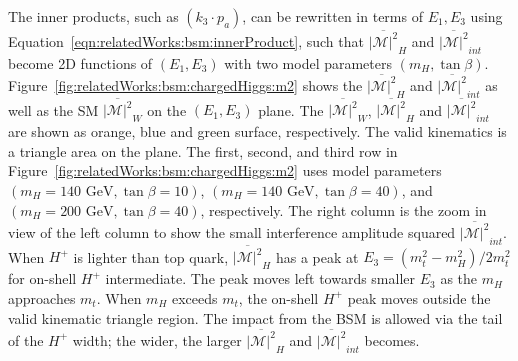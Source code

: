 \noindent The inner products, such as $(k_3 \cdot p_a) $, can be rewritten in terms of $E_1, E_3$ using Equation~\ref{eqn:relatedWorks:bsm:innerProduct}, such that $\overline{ |\mathcal{M}|^2 } _{H}$ and $ \overline{ |\mathcal{M}|^2 } _{int}$ become 2D functions of $(E_1, E_3)$  with two model parameters $(m_H, \tan\beta)$. Figure~\ref{fig:relatedWorks:bsm:chargedHiggs:m2} shows the $\overline{ |\mathcal{M}|^2 } _{H}$ and $ \overline{ |\mathcal{M}|^2 } _{int}$ as well as the SM $\overline{ |\mathcal{M}|^2 } _{W}$ on the $(E_1, E_3)$  plane. The $\overline{ |\mathcal{M}|^2 } _{W}$, $\overline{ |\mathcal{M}|^2 } _{H} $ and $\overline{ |\mathcal{M}|^2 } _{int}$ are shown as orange, blue and green surface, respectively. The valid kinematics is a triangle area on the plane. The first, second, and third row in Figure~\ref{fig:relatedWorks:bsm:chargedHiggs:m2} uses model parameters $(m_H = 140 \text{ GeV}, \tan\beta=10)$, $(m_H = 140 \text{ GeV}, \tan\beta=40)$, and $(m_H = 200 \text{ GeV}, \tan\beta=40)$, respectively. The right column is the zoom in view of the left column to show the small interference amplitude squared $ \overline{ |\mathcal{M}|^2 } _{int}$. When $H^+$ is lighter than top quark, $\overline{ |\mathcal{M}|^2 } _{H}$ has a peak at $E_3=(m_t^2-m_H^2)/2m_t^2$ for on-shell $H^+$ intermediate. The peak moves left towards smaller $E_3$ as the $m_H$ approaches $m_t$. When $m_H$ exceeds $m_t$, the on-shell $H^+$ peak moves outside the valid kinematic triangle region. The impact from the BSM is allowed via the tail of the $H^+$ width; the wider, the larger $\overline{ |\mathcal{M}|^2 } _{H}$ and $ \overline{ |\mathcal{M}|^2 } _{int}$ becomes.

